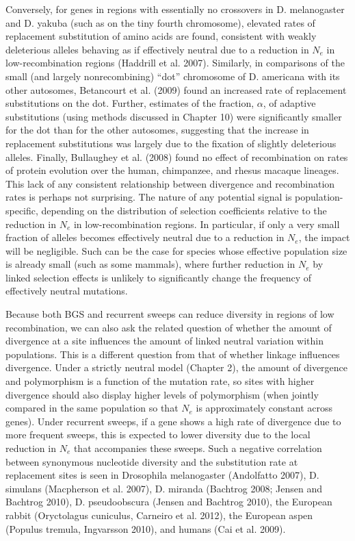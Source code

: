 \documentclass{article}
\begin{document}
Conversely, for genes in regions with essentially no crossovers in D. melanogaster and D. yakuba (such as on the tiny fourth chromosome), elevated rates of replacement substitution of amino acids are found, consistent with weakly deleterious alleles behaving as if effectively neutral due to a reduction in  $ N_{e} $ in low-recombination regions (Haddrill et al. 2007). Similarly, in comparisons of the small (and largely nonrecombining) “dot” chromosome of D. americana with its other autosomes, Betancourt et al. (2009) found an increased rate of replacement substitutions on the dot. Further, estimates of the fraction,  $ \alpha $, of adaptive substitutions (using methods discussed in Chapter 10) were significantly smaller for the dot than for the other autosomes, suggesting that the increase in replacement substitutions was largely due to the fixation of slightly deleterious alleles. Finally, Bullaughey et al. (2008) found no effect of recombination on rates of protein evolution over the human, chimpanzee, and rhesus macaque lineages. This lack of any consistent relationship between divergence and recombination rates is perhaps not surprising. The nature of any potential signal is population-specific, depending on the distribution of selection coefficients relative to the reduction in  $ N_{e} $ in low-recombination regions. In particular, if only a very small fraction of alleles becomes effectively neutral due to a reduction in  $ N_{e} $, the impact will be negligible. Such can be the case for species whose effective population size is already small (such as some mammals), where further reduction in  $ N_{e} $ by linked selection effects is unlikely to significantly change the frequency of effectively neutral mutations.

Because both BGS and recurrent sweeps can reduce diversity in regions of low recombination, we can also ask the related question of whether the amount of divergence at a site influences the amount of linked neutral variation within populations. This is a different question from that of whether linkage influences divergence. Under a strictly neutral model (Chapter 2), the amount of divergence and polymorphism is a function of the mutation rate, so sites with higher divergence should also display higher levels of polymorphism (when jointly compared in the same population so that  $ N_{e} $ is approximately constant across genes). Under recurrent sweeps, if a gene shows a high rate of divergence due to more frequent sweeps, this is expected to lower diversity due to the local reduction in  $ N_{e} $ that accompanies these sweeps. Such a negative correlation between synonymous nucleotide diversity and the substitution rate at replacement sites is seen in Drosophila melanogaster (Andolfatto 2007), D. simulans (Macpherson et al. 2007), D. miranda (Bachtrog 2008; Jensen and Bachtrog 2010), D. pseudoobscura (Jensen and Bachtrog 2010), the European rabbit (Oryctolagus cuniculus, Carneiro et al. 2012), the European aspen (Populus tremula, Ingvarsson 2010), and humans (Cai et al. 2009).
\end{document}
